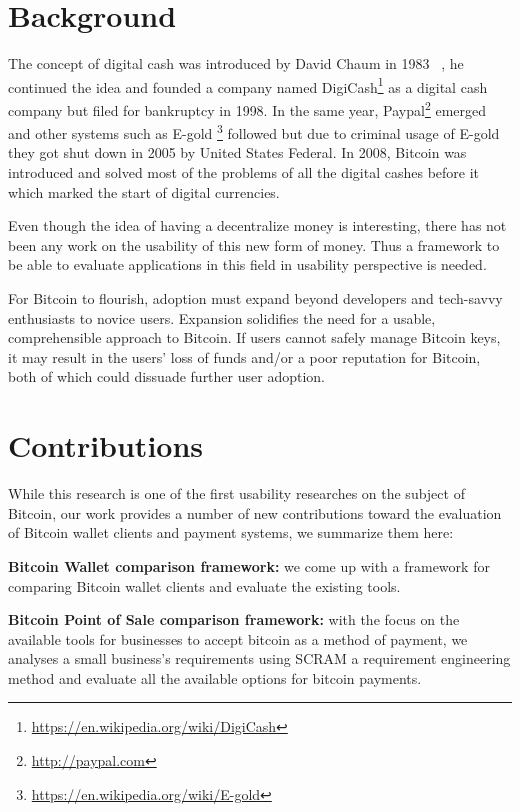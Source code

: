 \section{Background}
The concept of digital cash was introduced by David Chaum in 1983 ~\cite{chaum1983blind}, he continued the idea and founded a company named DigiCash\footnote{\url{https://en.wikipedia.org/wiki/DigiCash}} as a digital cash company but filed for bankruptcy in 1998. In the same year, Paypal\footnote{\url{http://paypal.com}} emerged and other systems such as E-gold \footnote{\url{https://en.wikipedia.org/wiki/E-gold}} followed but due to criminal usage of E-gold they got shut down in 2005 by United States Federal. In 2008, Bitcoin was introduced and solved most of the problems of all the digital cashes before it which marked the start of digital currencies.

Even though the idea of having a decentralize money is interesting, there has not been any work on the  usability of this new form of money. Thus a framework to be able to evaluate applications in this field in usability perspective is needed.

For Bitcoin to flourish, adoption must expand beyond developers and tech-savvy enthusiasts to novice users. Expansion solidifies the need for a usable, comprehensible approach to Bitcoin. If users cannot safely manage Bitcoin keys, it may result in the users' loss of funds and/or a poor reputation for Bitcoin, both of which could dissuade further user adoption. 






\section{Contributions}
While this research is one of the first usability researches on the subject of Bitcoin, our work provides a number of new contributions toward the evaluation of Bitcoin wallet clients and payment systems, we summarize them here:

\textbf{Bitcoin Wallet comparison framework:} we come up with a framework for comparing Bitcoin wallet clients and evaluate the existing tools.

\textbf{Bitcoin Point of Sale comparison framework: } with the focus on the available tools for businesses to accept bitcoin as a method of payment, we analyses a small business's requirements using SCRAM a requirement engineering method and evaluate all the available options for bitcoin payments.

